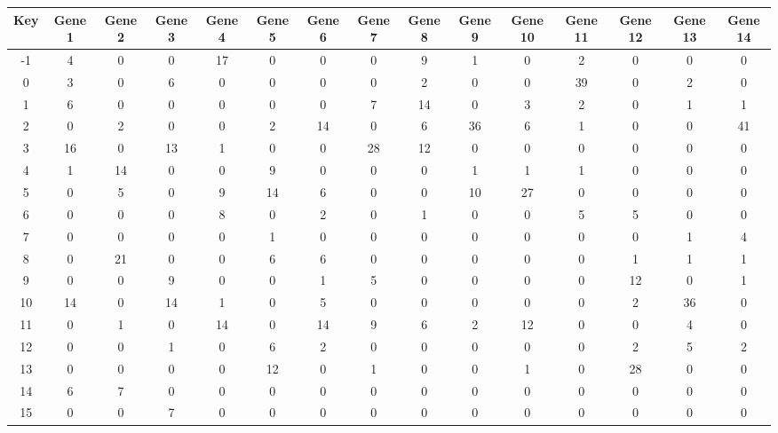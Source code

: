 \begin{tabular}{|c|c|c|c|c|c|c|c|c|c|c|c|c|c|c|}
\hline
Key & Gene 1 & Gene 2 & Gene 3 & Gene 4 & Gene 5 & Gene 6 & Gene 7 & Gene 8 & Gene 9 & Gene 10 & Gene 11 & Gene 12 & Gene 13 & Gene 14 \\
\hline
-1 & 4 & 0 & 0 & 17 & 0 & 0 & 0 & 9 & 1 & 0 & 2 & 0 & 0 & 0 \\
0 & 3 & 0 & 6 & 0 & 0 & 0 & 0 & 2 & 0 & 0 & 39 & 0 & 2 & 0 \\
1 & 6 & 0 & 0 & 0 & 0 & 0 & 7 & 14 & 0 & 3 & 2 & 0 & 1 & 1 \\
2 & 0 & 2 & 0 & 0 & 2 & 14 & 0 & 6 & 36 & 6 & 1 & 0 & 0 & 41 \\
3 & 16 & 0 & 13 & 1 & 0 & 0 & 28 & 12 & 0 & 0 & 0 & 0 & 0 & 0 \\
4 & 1 & 14 & 0 & 0 & 9 & 0 & 0 & 0 & 1 & 1 & 1 & 0 & 0 & 0 \\
5 & 0 & 5 & 0 & 9 & 14 & 6 & 0 & 0 & 10 & 27 & 0 & 0 & 0 & 0 \\
6 & 0 & 0 & 0 & 8 & 0 & 2 & 0 & 1 & 0 & 0 & 5 & 5 & 0 & 0 \\
7 & 0 & 0 & 0 & 0 & 1 & 0 & 0 & 0 & 0 & 0 & 0 & 0 & 1 & 4 \\
8 & 0 & 21 & 0 & 0 & 6 & 6 & 0 & 0 & 0 & 0 & 0 & 1 & 1 & 1 \\
9 & 0 & 0 & 9 & 0 & 0 & 1 & 5 & 0 & 0 & 0 & 0 & 12 & 0 & 1 \\
10 & 14 & 0 & 14 & 1 & 0 & 5 & 0 & 0 & 0 & 0 & 0 & 2 & 36 & 0 \\
11 & 0 & 1 & 0 & 14 & 0 & 14 & 9 & 6 & 2 & 12 & 0 & 0 & 4 & 0 \\
12 & 0 & 0 & 1 & 0 & 6 & 2 & 0 & 0 & 0 & 0 & 0 & 2 & 5 & 2 \\
13 & 0 & 0 & 0 & 0 & 12 & 0 & 1 & 0 & 0 & 1 & 0 & 28 & 0 & 0 \\
14 & 6 & 7 & 0 & 0 & 0 & 0 & 0 & 0 & 0 & 0 & 0 & 0 & 0 & 0 \\
15 & 0 & 0 & 7 & 0 & 0 & 0 & 0 & 0 & 0 & 0 & 0 & 0 & 0 & 0 \\
\hline
\end{tabular}